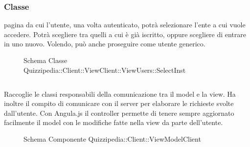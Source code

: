 \subsubsection{Classe }
pagina da cui l'utente, una volta autenticato, potrà selezionare l'ente a cui vuole accedere. Potrà scegliere tra quelli a cui è già iscritto, oppure scegliere di entrare in uno nuovo. Volendo, può anche proseguire come utente generico.
\begin{figure}[H]
\centering
\noindent{}
\caption[Schema Classe SelectInst]{Schema Classe Quizzipedia::Client::ViewClient::ViewUsers::SelectInst}
\end{figure}
\subsection{}
Raccoglie le classi responsabili della comunicazione tra il model e la view. Ha inoltre il compito di comunicare con il server per elaborare le richieste svolte dall'utente.
Con Angula.js il controller permette di tenere sempre aggiornato facilmente il model con le modifiche fatte nella view da parte dell'utente.
\begin{figure}[H]
\centering
\noindent{}
\caption[Schema Componente Quizzipedia::Client::ViewModelClient]{Schema Componente Quizzipedia::Client::ViewModelClient}
\end{figure}
